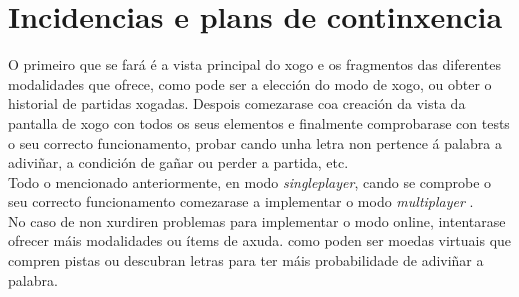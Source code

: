 \section{Incidencias e plans de continxencia}
O primeiro que se fará é a vista principal do xogo e os fragmentos das diferentes modalidades que ofrece, como pode ser a elección do modo de xogo, ou obter o historial de partidas xogadas.
Despois comezarase coa creación da vista da pantalla de xogo con todos os seus  elementos e finalmente comprobarase con tests o seu correcto funcionamento, probar cando unha letra non pertence á palabra a adiviñar, a condición de gañar ou perder a partida, etc.\\
Todo o mencionado anteriormente, en modo \textit{singleplayer}, cando se comprobe o seu correcto funcionamento comezarase a implementar o modo \textit{multiplayer} .%
\\
No caso de non xurdiren problemas para implementar o modo online, intentarase ofrecer máis modalidades ou ítems de axuda. %
como poden ser moedas virtuais que compren pistas ou descubran letras para ter máis probabilidade de adiviñar a palabra.



